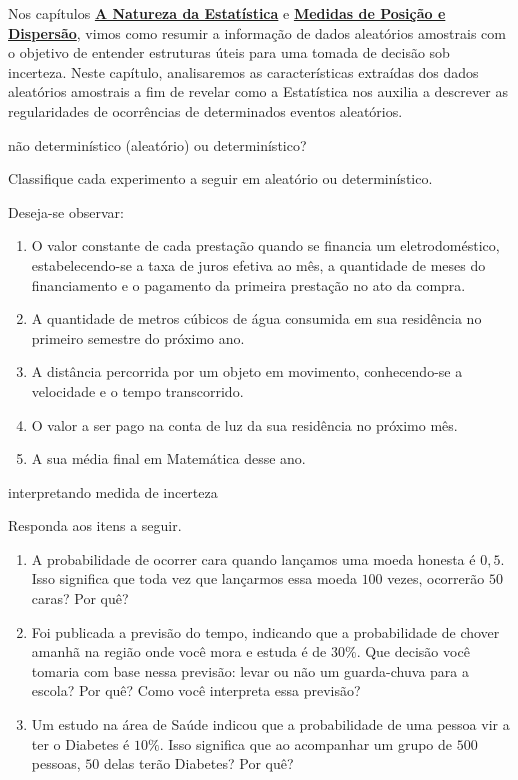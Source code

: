 Nos capítulos \hyperref[est1-chap]{\textbf{A Natureza da Estatística}} e \hyperref[est2-chap]{\textbf{Medidas de Posição e Dispersão}}, vimos como resumir a informação de dados aleatórios amostrais com o objetivo de  entender estruturas úteis para uma tomada de decisão sob incerteza. Neste capítulo, analisaremos as características extraídas dos dados aleatórios amostrais a fim de revelar como a Estatística nos auxilia a descrever as regularidades de ocorrências de determinados eventos aleatórios.
\clearpage

\begin{task}{não determinístico (aleatório) ou determinístico?}

Classifique cada experimento a seguir em aleatório ou determinístico.

Deseja-se observar:
\begin{enumerate}[rightmargin=3mm]
\item 
O valor constante de cada prestação quando se financia um eletrodoméstico, estabelecendo-se a taxa de juros efetiva ao mês, a quantidade de meses do financiamento e o pagamento da primeira prestação no ato da compra.

\item 
A quantidade de metros cúbicos de água consumida em sua residência no primeiro semestre do próximo ano.


\item 
A distância percorrida por um objeto em movimento, conhecendo-se a velocidade e o tempo transcorrido.

\item 
O valor a ser pago na conta de luz da sua residência no próximo mês.

\item 
A sua média final em Matemática desse ano.

\end{enumerate}
\end{task}
\begin{task}{interpretando medida de incerteza}


Responda aos itens a seguir.
\begin{enumerate}
\item {} 
A probabilidade de ocorrer cara quando lançamos uma moeda honesta é $0{,}5$. Isso significa que toda vez que lançarmos essa moeda $100$ vezes, ocorrerão $50$ caras? Por quê?

\item {} 
Foi publicada a previsão do tempo, indicando que a probabilidade de chover amanhã na região onde você mora e estuda é de $30\%$. Que decisão você tomaria com base nessa previsão: levar ou não um guarda-chuva para a escola? Por quê? Como você interpreta essa previsão?

\item {} 
Um estudo na área de Saúde indicou que a probabilidade de uma pessoa vir a ter o Diabetes é $10\%$. Isso significa que ao acompanhar um grupo de $500$ pessoas, $50$ delas terão Diabetes? Por quê?

\end{enumerate}
\end{task}
